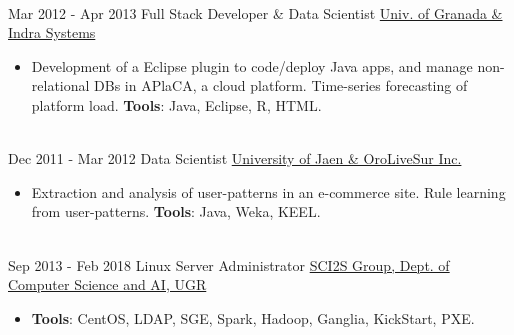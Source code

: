 \documentclass[letterpaper]{twentysecondcv} %
\begin{document}
\begin{twenty}
\\
	  \twentyitem
    	{Mar 2012 -}
		{Apr 2013}
        {Full Stack Developer \& Data Scientist}
        {\href{https://www.indracompany.com/en/}{Univ. of Granada \& Indra Systems}}
        {}
        {\begin{itemize}
        	\item Development of a Eclipse plugin to code/deploy Java apps, and manage non-relational DBs in APlaCA, a cloud platform. Time-series forecasting of platform load. \textbf{Tools}: Java, Eclipse, R, HTML.
        \end{itemize}}
        \\
        \twentyitem
    	{Dec 2011 -}
		{Mar 2012}
        {Data Scientist}
        {\href{http://en.orolivesur.com/}{University of Jaen \& OroLiveSur Inc.}}
        {}
        {\begin{itemize}
        	\item Extraction and analysis of user-patterns in an e-commerce site. Rule learning from user-patterns. \textbf{Tools}: Java, Weka, KEEL.
        \end{itemize}}
        \\
    \twentyitem
   		{Sep 2013 -}
		{Feb 2018}
        {Linux Server Administrator}
        {\href{http://sci2s.ugr.es}{SCI2S Group, Dept. of Computer Science and AI, UGR}}
        {}
        {
        {\begin{itemize}
        \item \textbf{Tools}: CentOS, LDAP, SGE, Spark, Hadoop, Ganglia, KickStart, PXE.
    \end{itemize}}
        }
\end{twenty}
\end{document}
